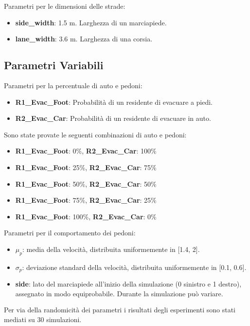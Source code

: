 \noindent
Parametri per le dimensioni delle strade:
\begin{itemize}
  \item \textbf{side\_width}: 1.5 m. Larghezza di un marciapiede.
  \item \textbf{lane\_width}: 3.6 m. Larghezza di una corsia.
\end{itemize}

\subsection{Parametri Variabili}

Parametri per la percentuale di auto e pedoni:
\begin{itemize}
  \item \textbf{R1\_Evac\_Foot}: Probabilità di un residente di evacuare a piedi.
  \item \textbf{R2\_Evac\_Car}: Probabilità di un residente di evacuare in auto.
\end{itemize}

\noindent
Sono state provate le seguenti combinazioni di auto e pedoni:
\begin{itemize}
  \item \textbf{R1\_Evac\_Foot}: 0\%, \textbf{R2\_Evac\_Car}: 100\%
  \item \textbf{R1\_Evac\_Foot}: 25\%, \textbf{R2\_Evac\_Car}: 75\%
  \item \textbf{R1\_Evac\_Foot}: 50\%, \textbf{R2\_Evac\_Car}: 50\%
  \item \textbf{R1\_Evac\_Foot}: 75\%, \textbf{R2\_Evac\_Car}: 25\%
  \item \textbf{R1\_Evac\_Foot}: 100\%, \textbf{R2\_Evac\_Car}: 0\%
\end{itemize}

\noindent
Parametri per il comportamento dei pedoni:
\begin{itemize}
  \item \textbf{$\mu_p$}: media della velocità, distribuita uniformemente in [1.4, 2].
  \item \textbf{$\sigma_p$}: deviazione standard della velocità, distribuita uniformemente in [0.1, 0.6].
  \item \textbf{side}: lato del marciapiede all'inizio della simulazione (0 sinistro e 1 destro), assegnato in modo equiprobabile. 
  Durante la simulazione può variare. 
\end{itemize}

\noindent
Per via della randomicità dei parametri i risultati degli esperimenti sono stati mediati su 30 simulazioni.
